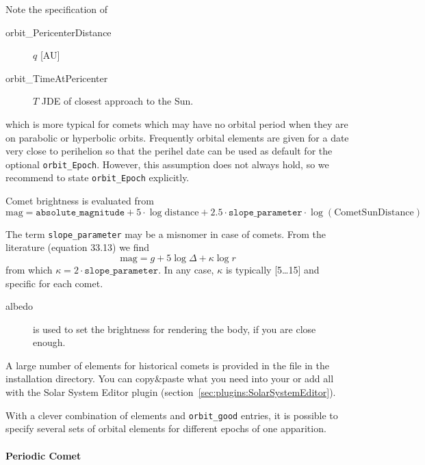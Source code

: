 Note the specification of
\begin{description}
\item[orbit\_PericenterDistance] $q$ [AU]
\item[orbit\_TimeAtPericenter] $T$  JDE of closest approach to the Sun.
\end{description}
which is more typical for comets which may have no orbital period when
they are on parabolic or hyperbolic orbits. Frequently orbital
elements are given for a date very close to perihelion so that the
perihel date can be used as default for the optional
\texttt{orbit\_Epoch}. However, this assumption does not always hold,
so we recommend to state \texttt{orbit\_Epoch} explicitly.


Comet brightness is evaluated from
\begin{equation}
  \label{eq:comet_magnitudes}
  \mathrm{mag}=\mathtt{absolute\_magnitude}+5\cdot\log{\mathrm{distance}} + 2.5\cdot\mathtt{slope\_parameter}\cdot\log(\mathrm{CometSunDistance})
\end{equation}

The term \texttt{slope\_parameter} may be a misnomer in case of
comets. From the literature \citep{AstronomicalAlgorithms:1998} (equation 33.13) we find
\begin{equation}
  \label{eq:comet_magnitudes_Meeus}
  \mathrm{mag}=g+5\log\Delta + \kappa\log r
\end{equation}
from which $\kappa=2\cdot\mathtt{slope\_parameter}$. In any case, $\kappa$ is typically [5\ldots15] and specific for each comet.

\begin{description}
\item[albedo] is used to set the brightness for rendering the body,
if you are close enough. 
\end{description}

A large number of elements for historical comets is provided in the
file  in the installation directory. You
can copy\&paste what you need into your
 or add all with the Solar System Editor plugin (section~\ref{sec:plugins:SolarSystemEditor}). 


With a clever combination of elements and \texttt{orbit\_good}
entries,  it is possible to specify several sets of
orbital elements for different epochs of one apparition.

\paragraph{Periodic Comet}
\label{sec:ssystem.ini:Comet:Periodic}

